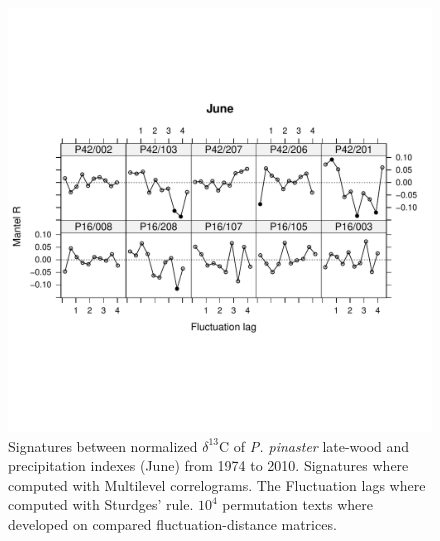 \documentclass[review,authoryear]{elsarticle}
\begin{document}
 
\clearpage
\begin{figure}\centering
\includegraphics[scale=0.9,trim=20mm 0mm 20mm 0mm]{mflucJun} 
\caption{Signatures between normalized $\delta^{13}$C of
  \textit{P. pinaster} late-wood and precipitation indexes
  (June) from 1974 to 2010. Signatures where computed with Multilevel
  correlograms. The Fluctuation lags where computed with Sturdges'
  rule. $10^4$ permutation texts where developed on compared
  fluctuation-distance matrices.}
\label{fig:signjun} 
\end{figure}
\end{document}
